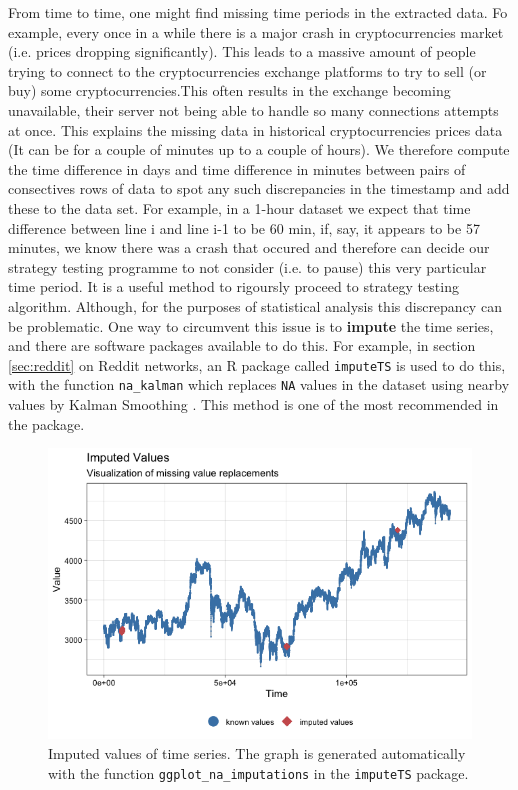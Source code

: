 \documentclass[twoside]{report}
\newcommand{\code}{\texttt}
\begin{document}
\begin{spacing}{1}
From time to time, one might find missing time periods in the extracted data. Fo example, every once in a while there is a major crash in cryptocurrencies market (i.e. prices dropping significantly). This leads to a massive amount of people trying to connect to the cryptocurrencies exchange platforms to try to sell (or buy) some cryptocurrencies.This often results in the exchange becoming unavailable, their server not being able to handle so many connections attempts at once. This explains the missing data in historical cryptocurrencies prices data (It can be for a couple of minutes up to a couple of hours). We therefore compute the time difference in days and time difference in minutes between pairs of consectives rows of data to spot any such discrepancies in the timestamp and add these to the data set. For example, in a 1-hour dataset we expect that time difference between line i and line i-1 to be 60 min, if, say, it appears to be 57 minutes, we know there was a crash that occured and therefore can decide our strategy testing programme to not consider (i.e. to pause) this very particular time period. It is a useful method to rigoursly proceed to strategy testing algorithm. 
Although, for the purposes of statistical analysis this discrepancy can be problematic. One way to circumvent this issue is to \textbf{impute} the time series, and there are software packages available to do this. For example, in section \ref{sec:reddit} on Reddit networks, an R package called \code{imputeTS} is used to do this, with the function \code{na\_kalman} which replaces \code{NA} values in the dataset using nearby values by Kalman Smoothing \cite{KalmanFilter}. This method is one of the most recommended in the package.

\begin{figure}[H]
    \centering
    \includegraphics[width=\linewidth]{Reddit_Analysis/Price_Data_Extraction/Data/Binance_OHLC/imputed_gg_1m.png}
    \caption{Imputed values of time series. The graph is generated automatically with the function \code{ggplot\_na\_imputations} in the \code{imputeTS} package.}
    \label{fig:imputations}
\end{figure}



\end{spacing}
\end{document}
